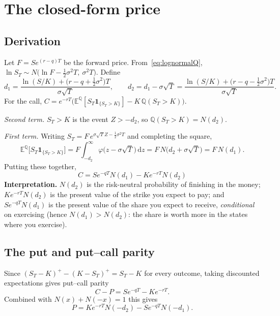\documentclass[11pt,a4paper]{article}
\newcommand{\E}{\mathbb{E}}
\newcommand{\Q}{\mathbb{Q}}
\newcommand{\npdf}{\varphi}
\newcommand{\dd}{\mathrm{d}}
\theoremstyle{plain}
\theoremstyle{remark}
\begin{document}
\section{The closed-form price}\label{sec:closed}

\subsection{Derivation}

Let $F=Se^{(r-q)T}$ be the forward price. From~\eqref{eq:lognormalQ},
$\ln S_T\sim N\big(\ln F-\tfrac12\sigma^2T,\ \sigma^2T\big)$. Define
\begin{equation}\label{eq:d1d2}
d_1=\frac{\ln(S/K)+\big(r-q+\tfrac12\sigma^2\big)T}{\sigma\sqrt T},\qquad
d_2=d_1-\sigma\sqrt T=\frac{\ln(S/K)+\big(r-q-\tfrac12\sigma^2\big)T}{\sigma\sqrt T}.
\end{equation}
For the call, $C=e^{-rT}\big(\E^\Q[S_T\mathbf 1_{\{S_T>K\}}]-K\,\Q(S_T>K)\big)$.

\emph{Second term.} $S_T>K$ is the event $Z>-d_2$, so $\Q(S_T>K)=N(d_2)$.

\emph{First term.} Writing $S_T=F\,e^{\sigma\sqrt T Z-\frac12\sigma^2T}$ and completing the square,
\[
\E^\Q\big[S_T\mathbf 1_{\{S_T>K\}}\big]
= F\int_{-d_2}^{\infty}\npdf\big(z-\sigma\sqrt T\big)\,\dd z
= F\,N\big(d_2+\sigma\sqrt T\big)=F\,N(d_1).
\]
Putting these together,
\begin{equation}\label{eq:bscall}
\boxed{\,C=Se^{-qT}N(d_1)-Ke^{-rT}N(d_2)\,}
\end{equation}
\textbf{Interpretation.} $N(d_2)$ is the risk-neutral probability of finishing in the
money; $Ke^{-rT}N(d_2)$ is the present value of the strike you expect to pay; and
$Se^{-qT}N(d_1)$ is the present value of the share you expect to receive,
\emph{conditional} on exercising (hence $N(d_1)>N(d_2)$: the share is worth more
in the states where you exercise).

\subsection{The put and put--call parity}

Since $(S_T-K)^+-(K-S_T)^+=S_T-K$ for every outcome, taking discounted expectations gives
put--call parity
\begin{equation}\label{eq:parity}
C-P=Se^{-qT}-Ke^{-rT}.
\end{equation}
Combined with $N(x)+N(-x)=1$ this gives
\begin{equation}\label{eq:bsput}
P=Ke^{-rT}N(-d_2)-Se^{-qT}N(-d_1).
\end{equation}
\end{document}
